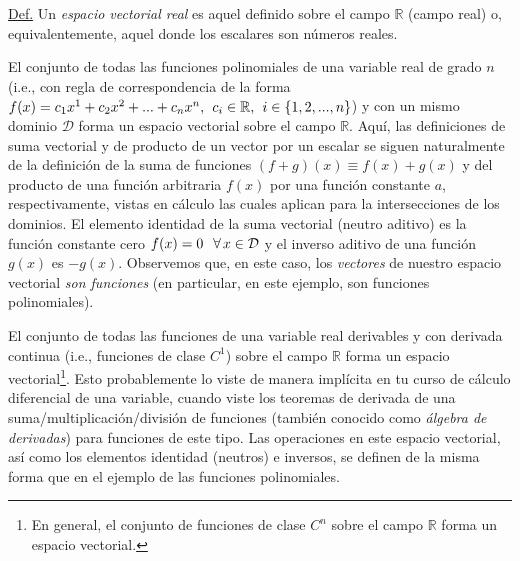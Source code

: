 \documentclass[12pt,dvipsnames]{article}
\begin{document}
\begin{tcolorbox}
\underline{Def.} Un \textit{espacio vectorial real} es aquel definido sobre el campo $\mathbb{R}$ (campo real) o, equivalentemente, aquel donde los escalares son números reales.
\end{tcolorbox}{}

El conjunto de todas las funciones polinomiales de una variable real de grado $n$ (i.e., con regla de correspondencia de la forma $f(x) = c_1 x^1 + c_2 x^2 + ... + c_n x^n, \hspace{1.5mm} c_i \in \mathbb{R}, \hspace{1.5mm} i \in \{1,2,...,n\}$) y con un mismo dominio $\mathcal{D}$ forma un espacio vectorial sobre el campo $\mathbb{R}$. Aquí, las definiciones de suma vectorial y de producto de un vector por un escalar se siguen naturalmente de la definición de la suma de funciones $(f+g)(x)\equiv f(x)+g(x)$ y del producto de una función arbitraria $f(x)$ por una función constante $a$, respectivamente, vistas en cálculo \textemdash las cuales aplican para la intersecciones de los dominios. El elemento identidad de la suma vectorial (neutro aditivo) es la función constante cero $f(x)=0\hspace{2.5mm} \forall\hspace{0.5mm}x\in\mathcal{D}$ y el inverso aditivo de una función $g(x)$ es $-g(x)$. Observemos que, en este caso, los \textit{vectores} de nuestro espacio vectorial \textit{son funciones} (en particular, en este ejemplo, son funciones polinomiales).

\vspace{3mm}

El conjunto de todas las funciones de una variable real derivables y con derivada continua (i.e., funciones de clase $C^1$) sobre el campo $\mathbb{R}$ forma un espacio vectorial\footnote{En general, el conjunto de funciones de clase $C^n$ sobre el campo $\mathbb{R}$ forma un espacio vectorial.}. Esto probablemente lo viste de manera implícita en tu curso de cálculo diferencial de una variable, cuando viste los teoremas de derivada de una suma/multiplicación/división de funciones (también conocido como \emph{álgebra de derivadas}) para funciones de este tipo. Las operaciones en este espacio vectorial, así como los elementos identidad (neutros) e inversos, se definen de la misma forma que en el ejemplo de las funciones polinomiales.

\vspace{3mm}
\end{document}
